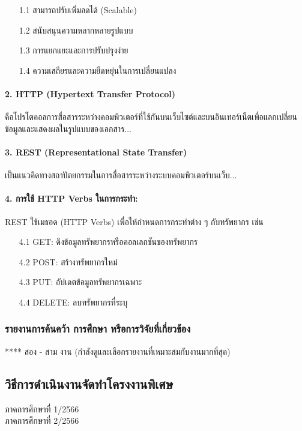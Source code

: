 \documentclass[12pt,a4paper]{article}
\begin{document}
\begin{enumerate}
    \item[1.1] สามารถปรับเพิ่มลดได้ (Scalable)
    \item[1.2] สนับสนุนความหลากหลายรูปแบบ
    \item[1.3] การแยกแยะและการปรับปรุงง่าย
    \item[1.4] ความเสถียรและความยืดหยุ่นในการเปลี่ยนแปลง
\end{enumerate}

\paragraph{2. HTTP (Hypertext Transfer Protocol)} คือโปรโตคอลการสื่อสารระหว่างคอมพิวเตอร์ที่ใช้กันบนเว็บไซต์และบนอินเทอร์เน็ตเพื่อแลกเปลี่ยนข้อมูลและแสดงผลในรูปแบบของเอกสาร...

\paragraph{3. REST (Representational State Transfer)} เป็นแนวคิดทางสถาปัตยกรรมในการสื่อสารระหว่างระบบคอมพิวเตอร์บนเว็บ...

\paragraph{4. การใช้ HTTP Verbs ในการกระทำ:} REST ใช้เมธอด (HTTP Verbs) เพื่อให้กำหนดการกระทำต่าง ๆ กับทรัพยากร เช่น
\begin{enumerate}
    \item[4.1] GET: ดึงข้อมูลทรัพยากรหรือคอลเลกชันของทรัพยากร
    \item[4.2] POST: สร้างทรัพยากรใหม่
    \item[4.3] PUT: อัปเดตข้อมูลทรัพยากรเฉพาะ
    \item[4.4] DELETE: ลบทรัพยากรที่ระบุ
\end{enumerate}

\subsubsection{รายงานการค้นคว้า การศึกษา หรือการวิจัยที่เกี่ยวข้อง}
**** สอง - สาม งาน (กำลังดูและเลือกรายงานที่เหมาะสมกับงานมากที่สุด)

\subsection{วิธีการดำเนินงานจัดทำโครงงานพิเศษ}
ภาคการศึกษาที่ 1/2566\\
ภาคการศึกษาที่ 2/2566
\end{document}
